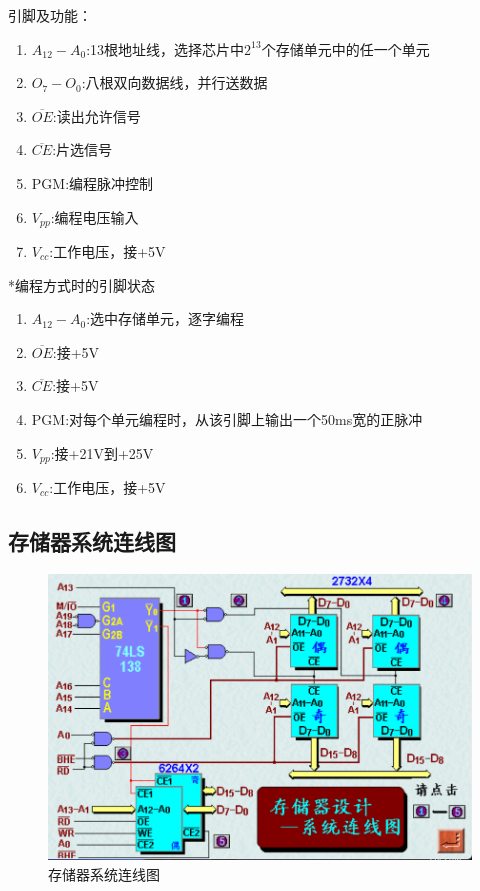 引脚及功能：
\begin{enumerate}
    \item $A_{12}-A_0$:13根地址线，选择芯片中$2^{13}$个存储单元中的任一个单元
    \item $O_7-O_0$:八根双向数据线，并行送数据
    \item $\overline{OE}$:读出允许信号
    \item $\overline{CE}$:片选信号
    \item PGM:编程脉冲控制
    \item $V_{pp}$:编程电压输入
    \item $V_{cc}$:工作电压，接+5V
\end{enumerate}
*编程方式时的引脚状态
\begin{enumerate}
    \item $A_{12}-A_0$:选中存储单元，逐字编程
    \item $\overline{OE}$:接+5V
    \item $\overline{CE}$:接+5V
    \item PGM:对每个单元编程时，从该引脚上输出一个50ms宽的正脉冲
    \item $V_{pp}$:接+21V到+25V
    \item $V_{cc}$:工作电压，接+5V
\end{enumerate}
\subsection{存储器系统连线图}
\begin{figure}[H]
    \centering
    \includegraphics[scale=1]{part_8086CPU/part_8086CPU_pic/存储器系统连线图.png}
    \caption{存储器系统连线图}
\end{figure}

